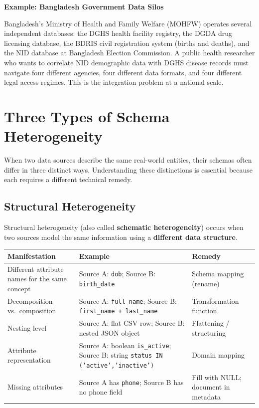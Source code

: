 \documentclass[12pt,a4paper]{article}
\newcommand{\examplebox}[2]{%
  \noindent
  \colorbox{PUTeal!10}{%
    \begin{minipage}{\dimexpr\linewidth-2\fboxsep}
      \vspace{4pt}\textbf{\textcolor{PUTeal}{Example: #1}}\par\vspace{2pt}
      #2\vspace{4pt}
    \end{minipage}%
  }\par\vspace{6pt}%
}
\begin{document}
\examplebox{Bangladesh Government Data Silos}{Bangladesh's Ministry of Health and Family Welfare (MOHFW) operates several independent databases: the DGHS health facility registry, the DGDA drug licensing database, the BDRIS civil registration system (births and deaths), and the NID database at Bangladesh Election Commission.  A public health researcher who wants to correlate NID demographic data with DGHS disease records must navigate four different agencies, four different data formats, and four different legal access regimes.  This is the integration problem at a national scale.}

\section{Three Types of Schema Heterogeneity}

When two data sources describe the same real-world entities, their schemas often differ in three distinct ways.  Understanding these distinctions is essential because each requires a different technical remedy.

\subsection{Structural Heterogeneity}

Structural heterogeneity (also called \textbf{schematic heterogeneity}) occurs when two sources model the same information using a \textbf{different data structure}.

\begin{center}
\renewcommand{\arraystretch}{1.5}
\begin{tabular}{p{4.5cm}p{4.8cm}p{3.5cm}}
  \toprule
  \textbf{Manifestation} & \textbf{Example} & \textbf{Remedy} \\
  \midrule
  Different attribute names for the same concept &
    Source A: \texttt{dob}; Source B: \texttt{birth\_date} &
    Schema mapping (rename) \\
  Decomposition vs.\ composition &
    Source A: \texttt{full\_name}; Source B: \texttt{first\_name + last\_name} &
    Transformation function \\
  Nesting level &
    Source A: flat CSV row; Source B: nested JSON object &
    Flattening / structuring \\
  Attribute representation &
    Source A: boolean \texttt{is\_active}; Source B: string \texttt{status IN ('active','inactive')} &
    Domain mapping \\
  Missing attributes &
    Source A has \texttt{phone}; Source B has no phone field &
    Fill with NULL; document in metadata \\
  \bottomrule
\end{tabular}
\end{center}
\end{document}
